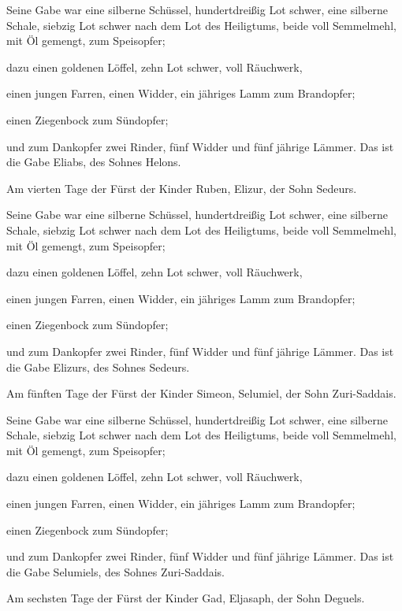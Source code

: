  Seine Gabe war eine silberne Schüssel, hundertdreißig Lot
schwer, eine silberne Schale, siebzig Lot schwer nach dem Lot des
Heiligtums, beide voll Semmelmehl, mit Öl gemengt, zum Speisopfer;

 dazu einen goldenen Löffel, zehn Lot schwer, voll
Räuchwerk,

 einen jungen Farren, einen Widder, ein jähriges Lamm zum
Brandopfer;

 einen Ziegenbock zum Sündopfer;

 und zum Dankopfer zwei Rinder, fünf Widder und fünf
jährige Lämmer. Das ist die Gabe Eliabs, des Sohnes Helons.

 Am vierten Tage der Fürst der Kinder Ruben, Elizur, der
Sohn Sedeurs.

 Seine Gabe war eine silberne Schüssel, hundertdreißig Lot
schwer, eine silberne Schale, siebzig Lot schwer nach dem Lot des
Heiligtums, beide voll Semmelmehl, mit Öl gemengt, zum Speisopfer;

 dazu einen goldenen Löffel, zehn Lot schwer, voll
Räuchwerk,

 einen jungen Farren, einen Widder, ein jähriges Lamm zum
Brandopfer;

 einen Ziegenbock zum Sündopfer;

 und zum Dankopfer zwei Rinder, fünf Widder und fünf
jährige Lämmer. Das ist die Gabe Elizurs, des Sohnes Sedeurs.

 Am fünften Tage der Fürst der Kinder Simeon, Selumiel, der
Sohn Zuri-Saddais.

 Seine Gabe war eine silberne Schüssel, hundertdreißig Lot
schwer, eine silberne Schale, siebzig Lot schwer nach dem Lot des
Heiligtums, beide voll Semmelmehl, mit Öl gemengt, zum Speisopfer;

 dazu einen goldenen Löffel, zehn Lot schwer, voll
Räuchwerk,

 einen jungen Farren, einen Widder, ein jähriges Lamm zum
Brandopfer;

 einen Ziegenbock zum Sündopfer;

 und zum Dankopfer zwei Rinder, fünf Widder und fünf
jährige Lämmer. Das ist die Gabe Selumiels, des Sohnes Zuri-Saddais.

 Am sechsten Tage der Fürst der Kinder Gad, Eljasaph, der
Sohn Deguels.

